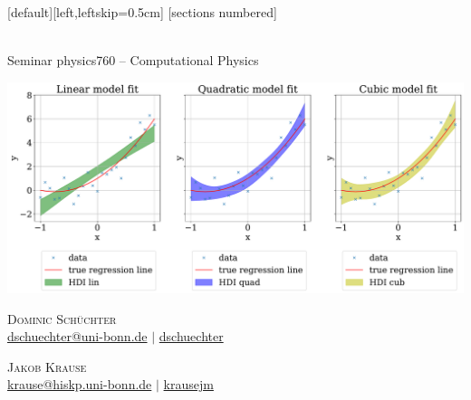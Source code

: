 \documentclass[11pt,aspectratio=1610,dvipsnames]{beamer}
\begin{document}
[default][left,leftskip=0.5cm]
%
[sections numbered]
\captionsetup{font=scriptsize,labelfont=scriptsize}



\begin{frame}[plain]
	\setcounter{page}{0}
	\centering
	{\Large {}}\\
	{Seminar physics760 -- Computational Physics}
	\vfill
	
	\includegraphics[width=0.8\linewidth]{figs/HDI_sigma_07a.pdf}
	\vfill
	\begin{minipage}{\linewidth}
		\centering
		\begin{minipage}{0.45\linewidth}
			\centering
			\textsc{Dominic Schüchter}\\
			\scriptsize \href{mailto:dschuechter@uni-bonn.de}{\faEnvelope  \hspace*{0.1cm}dschuechter@uni-bonn.de} {\color{black}$|$} \href{https://github.com/dschuechter}{\faGithub  \hspace*{0.1cm}dschuechter}\\
		\end{minipage}
		\begin{minipage}{0.45\linewidth}
			\centering
			\textsc{Jakob Krause}\\
			\scriptsize \href{mailto:krause@hiskp.uni-bonn.de}{\faEnvelope  \hspace*{0.1cm}krause@hiskp.uni-bonn.de} {\color{black}$|$} \href{https://github.com/krausejm}{\faGithub  \hspace*{0.1cm}krausejm}\\
		\end{minipage}
	\vspace{.5cm}
	

\end{minipage}
\end{frame}
\end{document}

